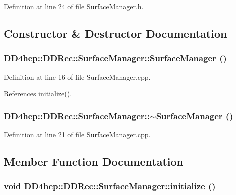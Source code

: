Definition at line 24 of file SurfaceManager.h.

\subsection{Constructor \& Destructor Documentation}
\hypertarget{class_d_d4hep_1_1_d_d_rec_1_1_surface_manager_ade79c900350308b6523dd7964e156af3}{
\subsubsection[{SurfaceManager}]{\setlength{\rightskip}{0pt plus 5cm}DD4hep::DDRec::SurfaceManager::SurfaceManager ()}}
\label{class_d_d4hep_1_1_d_d_rec_1_1_surface_manager_ade79c900350308b6523dd7964e156af3}


Definition at line 16 of file SurfaceManager.cpp.

References initialize().\hypertarget{class_d_d4hep_1_1_d_d_rec_1_1_surface_manager_aaa040a3a6384a601d1c3bc1e79ba4f3f}{
\subsubsection[{$\sim$SurfaceManager}]{\setlength{\rightskip}{0pt plus 5cm}DD4hep::DDRec::SurfaceManager::$\sim$SurfaceManager ()}}
\label{class_d_d4hep_1_1_d_d_rec_1_1_surface_manager_aaa040a3a6384a601d1c3bc1e79ba4f3f}


Definition at line 21 of file SurfaceManager.cpp.

\subsection{Member Function Documentation}
\hypertarget{class_d_d4hep_1_1_d_d_rec_1_1_surface_manager_a418776e91006ad305f08e6bfde675ec9}{
\subsubsection[{initialize}]{\setlength{\rightskip}{0pt plus 5cm}void DD4hep::DDRec::SurfaceManager::initialize ()}}
\label{class_d_d4hep_1_1_d_d_rec_1_1_surface_manager_a418776e91006ad305f08e6bfde675ec9}


